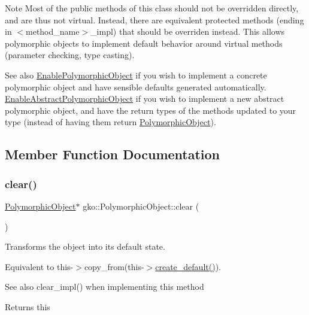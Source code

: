 \begin{DoxyNote}{Note}
Most of the public methods of this class should not be overridden directly, and are thus not virtual. Instead, there are equivalent protected methods (ending in $<$method\+\_\+name$>$\+\_\+impl) that should be overriden instead. This allows polymorphic objects to implement default behavior around virtual methods (parameter checking, type casting).
\end{DoxyNote}
\begin{DoxySeeAlso}{See also}
\hyperlink{classgko_1_1EnablePolymorphicObject}{Enable\+Polymorphic\+Object} if you wish to implement a concrete polymorphic object and have sensible defaults generated automatically. \hyperlink{classgko_1_1EnableAbstractPolymorphicObject}{Enable\+Abstract\+Polymorphic\+Object} if you wish to implement a new abstract polymorphic object, and have the return types of the methods updated to your type (instead of having them return \hyperlink{classgko_1_1PolymorphicObject}{Polymorphic\+Object}). 
\end{DoxySeeAlso}


\subsection{Member Function Documentation}
\mbox{\label{classgko_1_1PolymorphicObject_a8bb6f9995e8166099ca3ecab51d98df5}} 
\subsubsection{\texorpdfstring{clear()}{clear()}}
{\footnotesize\ttfamily \hyperlink{classgko_1_1PolymorphicObject}{Polymorphic\+Object}$\ast$ gko\+::\+Polymorphic\+Object\+::clear (\begin{DoxyParamCaption}{ }\end{DoxyParamCaption})\hspace{0.3cm}{\ttfamily [inline]}}



Transforms the object into its default state. 

Equivalent to {\ttfamily this-\/$>$copy\+\_\+from(this-\/$>$\hyperlink{classgko_1_1PolymorphicObject_aca2ad91eee15e667cc0e7d1444a6de47}{create\+\_\+default()})}.

\begin{DoxySeeAlso}{See also}
clear\+\_\+impl() when implementing this method
\end{DoxySeeAlso}
\begin{DoxyReturn}{Returns}
this 
\end{DoxyReturn}
\mbox{\label{classgko_1_1PolymorphicObject_ada90b9acf2e6b3201a9b2e09ac56217f}} 
